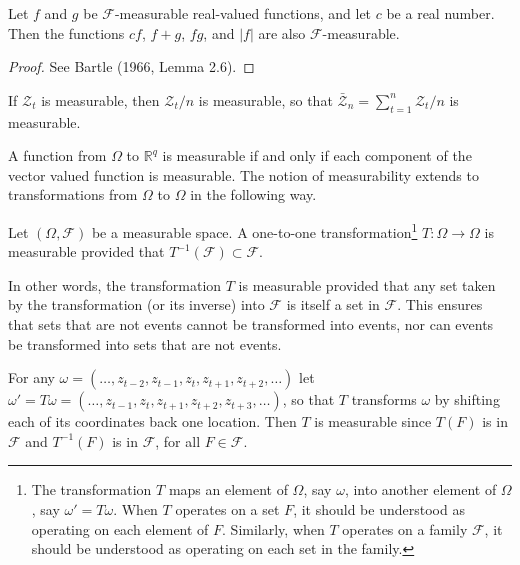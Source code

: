 \begin{proposition}\label{prop:measurable-operations}
Let $f$ and $g$ be $\mathcal{F}$-measurable real-valued functions, and let $c$ be a real number. Then the functions $cf$, $f + g$, $fg$, and $|f|$ are also $\mathcal{F}$-measurable.
\end{proposition}

\begin{proof}
See Bartle (1966, Lemma 2.6). \qedhere
\end{proof}

\begin{example}\label{ex:measurable-zbar}
If $\mathcal{Z}_t$ is measurable, then $\mathcal{Z}_t / n$ is measurable, so that $\bar{\mathcal{Z}}_n = \sum_{t=1}^{n} \mathcal{Z}_t / n$ is measurable.
\end{example}

A function from $\Omega$ to $\mathbb{R}^q$ is measurable if and only if each component of the vector valued function is measurable. The notion of measurability extends to transformations from $\Omega$ to $\Omega$ in the following way.

\begin{definition}\label{def:measurable-transformation}
Let $(\Omega, \mathcal{F})$ be a measurable space. A one-to-one transformation\footnote{The transformation $T$ maps an element of $\Omega$, say $\omega$, into another element of $\Omega$, say $\omega' = T\omega$. When $T$ operates on a set $F$, it should be understood as operating on each element of $F$. Similarly, when $T$ operates on a family $\mathcal{F}$, it should be understood as operating on each set in the family.} $T : \Omega \to \Omega$ is measurable provided that $T^{-1}(\mathcal{F}) \subset \mathcal{F}$.
\end{definition}

In other words, the transformation $T$ is measurable provided that any set taken by the transformation (or its inverse) into $\mathcal{F}$ is itself a set in $\mathcal{F}$. This ensures that sets that are not events cannot be transformed into events, nor can events be transformed into sets that are not events.

\begin{example}\label{ex:shift-transformation}
For any $\omega = (\ldots, z_{t-2}, z_{t-1}, z_t, z_{t+1}, z_{t+2}, \ldots)$ let $\omega' = T\omega = (\ldots, z_{t-1}, z_t, z_{t+1}, z_{t+2}, z_{t+3}, \ldots)$, so that $T$ transforms $\omega$ by shifting each of its coordinates back one location. Then $T$ is measurable since $T(F)$ is in $\mathcal{F}$ and $T^{-1}(F)$ is in $\mathcal{F}$, for all $F \in \mathcal{F}$.
\end{example}

